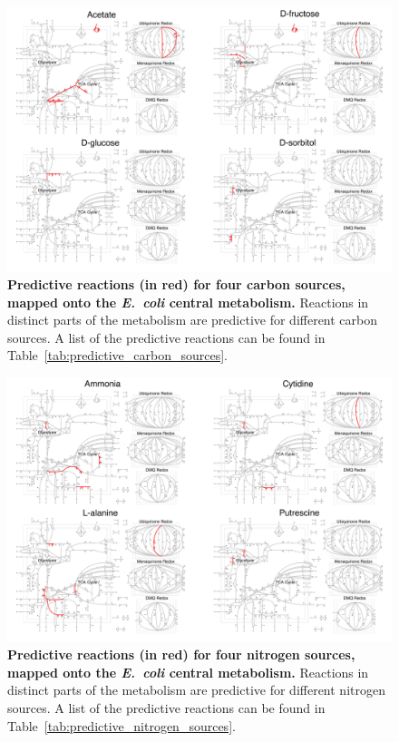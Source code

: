 \documentclass[12pt]{article}
\begin{document}
\clearpage
\begin{figure}[p]
\centerline{\includegraphics[width=5in]{Figures/carbon/carbon_grid.pdf}}
\caption{\label{fig:carbon_network}\textbf{Predictive reactions (in red) for four carbon sources, mapped onto the \emph{E.\ coli} central metabolism.} Reactions in distinct parts of the metabolism are predictive for different carbon sources. A list of the predictive reactions can be found in Table~\ref{tab:predictive_carbon_sources}.}
\end{figure}

\clearpage
\begin{figure}[p]
\centerline{\includegraphics[width=5in]{Figures/nitrogen/nitrogen_grid.pdf}}
\caption{\label{fig:nitrogen_network}\textbf{Predictive reactions (in red) for four nitrogen sources, mapped onto the \emph{E.\ coli} central metabolism.} Reactions in distinct parts of the metabolism are predictive for different nitrogen sources. A list of the predictive reactions can be found in Table~\ref{tab:predictive_nitrogen_sources}.}
\end{figure}
\end{document}
